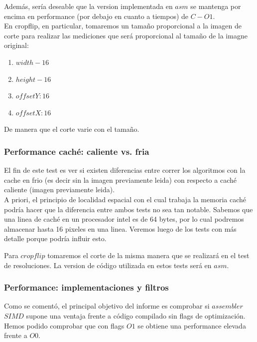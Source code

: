 Además, sería deseable que la version implementada en $asm$ se mantenga por encima en performance (por debajo en cuanto a tiempos) de $C-O1$. \\ 
En cropflip, en particular, tomaremos un tamaño proporcional a la imagen de corte para realizar las mediciones que será proporcional al tamaño de la imagne original: \\

\begin{enumerate}
\item $width-16$ 
\item $height-16$
\item $offsetY: 16$
\item $offsetX: 16$
\end{enumerate}

De manera que el corte varie con el tamaño. 

\subsubsection{Performance caché: caliente vs. fria}

El fin de este test es ver si existen diferencias entre correr los algoritmos con la cache en frio (es decir sin la imagen previamente leida) con respecto a caché caliente (imagen previamente leida). \\

A priori, el principio de localidad espacial con el cual trabaja la memoria caché podría hacer que la diferencia entre ambos tests no sea tan notable. 
Sabemos que una linea de caché en un procesador intel es de 64 bytes, por lo cual podremos almacenar hasta 16 pixeles en una linea. Veremos luego de los tests con más detalle porque podría influir esto.

Para $cropflip$ tomaremos el corte de la misma manera que se realizará en el test de resoluciones.
La version de código utilizada en estos tests será en $asm$.

\subsubsection{Performance: implementaciones y filtros}

Como se comentó, el principal objetivo del informe es comprobar si $assembler$ $SIMD$ supone una ventaja frente a código compilado sin flags de optimización. 
Hemos podido comprobar que con flags $O1$ se obtiene una performance elevada frente a $O0$.\\

